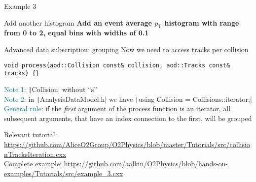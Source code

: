 \documentclass[10pt,lualatex,xcolor={table,svgnames},{hyperref={bookmarks=true,linktoc=all}},aspectratio=169]{beamer}
\newcommand{\programmatic}[1]{\textcolor{-green!40!yellow}{#1}}
\newcommand{\notion}[1]{\textcolor{teal}{#1}}
\newcommand{\codeline}[1]{{\texttt|#1|}}
\begin{document}
\begin{frame}{Example 3}
\begin{block}{Add another histogram}
\textbf{Add an event average $p_{\text{T}}$ histogram with range from 0 to 2, equal bins with widths of 0.1}
\end{block}
\begin{block}{Advanced data subscription: grouping}
Now we need to access tracks per collision
\begin{verbatim}
void process(aod::Collision const& collision, aod::Tracks const& tracks) {}
\end{verbatim}
\notion{Note 1}: \codeline{Collision} without \enquote{s} \\
\notion{Note 2}: in \codeline{AnalysisDataModel.h} we have \codeline{using Collision = Collisions::iterator;} \\
\notion{General rule}: if the \emph{first} argument of the process function is an \programmatic{iterator}, all subsequent arguments, that have an \programmatic{index} connection to the first, will be \programmatic{grouped}
\end{block}

{\footnotesize Relevant tutorial:  \href{https://github.com/AliceO2Group/O2Physics/blob/master/Tutorials/src/collisionTracksIteration.cxx}{https://github.com/AliceO2Group/O2Physics/blob/master/Tutorials/src/collisionTracksIteration.cxx} \\
    Complete example: \href{https://github.com/aalkin/O2Physics/blob/hands-on-examples/Tutorials/src/example_3.cxx}{https://github.com/aalkin/O2Physics/blob/hands-on-examples/Tutorials/src/example\_3.cxx}
}
\end{frame}
\end{document}
